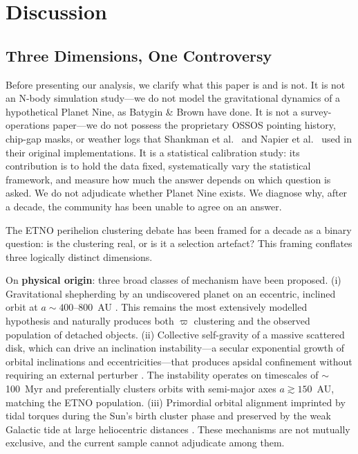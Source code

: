 \documentclass[12pt,a4paper]{article}
\begin{document}
\section{Discussion}

\subsection{Three Dimensions, One Controversy}

Before presenting our analysis, we clarify what this paper is and is not. It is not an N-body simulation study---we do not model the gravitational dynamics of a hypothetical Planet Nine, as Batygin \& Brown \cite{batygin2016,brown2019} have done. It is not a survey-operations paper---we do not possess the proprietary OSSOS pointing history, chip-gap masks, or weather logs that Shankman et al.\ \cite{shankman2017} and Napier et al.\ \cite{napier2021} used in their original implementations. It is a statistical calibration study: its contribution is to hold the data fixed, systematically vary the statistical framework, and measure how much the answer depends on which question is asked. We do not adjudicate whether Planet Nine exists. We diagnose why, after a decade, the community has been unable to agree on an answer.

The ETNO perihelion clustering debate has been framed for a decade as a binary question: is the clustering real, or is it a selection artefact? This framing conflates three logically distinct dimensions.

On \textbf{physical origin}: three broad classes of mechanism have been proposed. (i) Gravitational shepherding by an undiscovered planet on an eccentric, inclined orbit at $a\sim400$--800~AU \cite{batygin2016,brown2019,batygin2019,siraj2025}. This remains the most extensively modelled hypothesis and naturally produces both $\varpi$ clustering and the observed population of detached objects. (ii) Collective self-gravity of a massive scattered disk, which can drive an inclination instability---a secular exponential growth of orbital inclinations and eccentricities---that produces apsidal confinement without requiring an external perturber \cite{madigan2018,zderic2020}. The instability operates on timescales of $\sim$100~Myr and preferentially clusters orbits with semi-major axes $a\gtrsim150$~AU, matching the ETNO population. (iii) Primordial orbital alignment imprinted by tidal torques during the Sun's birth cluster phase and preserved by the weak Galactic tide at large heliocentric distances \cite{trujillo2014}. These mechanisms are not mutually exclusive, and the current sample cannot adjudicate among them.
\end{document}
